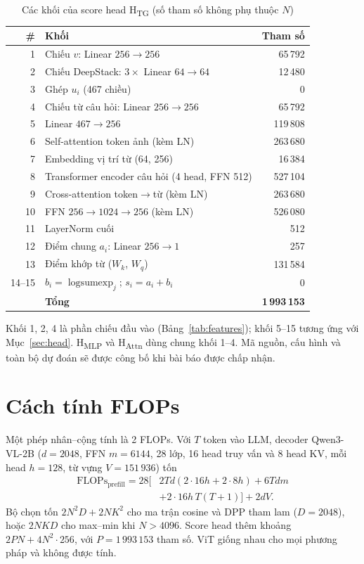 \documentclass[conference]{IEEEtran}
\newcommand{\Hmlp}{H\textsubscript{MLP}}
\newcommand{\Hattn}{H\textsubscript{Attn}}
\newcommand{\Htg}{H\textsubscript{TG}}
\begin{document}
\begin{table}[!htbp]
\centering
\caption{Các khối của score head \Htg{} (số tham số không phụ thuộc $N$)}
\label{tab:head}
\setlength{\tabcolsep}{3pt}
\footnotesize
\begin{tabular}{@{}rlr@{}}
\toprule
\# & Khối & Tham số\\
\midrule
1 & Chiếu $v$: Linear $256\rightarrow256$ & 65\,792\\
2 & Chiếu DeepStack: $3\times$ Linear $64\rightarrow64$ & 12\,480\\
3 & Ghép $u_i$ (467 chiều) & 0\\
4 & Chiếu từ câu hỏi: Linear $256\rightarrow256$ & 65\,792\\
5 & Linear $467\rightarrow256$ & 119\,808\\
6 & Self-attention token ảnh (kèm LN) & 263\,680\\
7 & Embedding vị trí từ (64, 256) & 16\,384\\
8 & Transformer encoder câu hỏi (4 head, FFN 512) & 527\,104\\
9 & Cross-attention token$\rightarrow$từ (kèm LN) & 263\,680\\
10 & FFN $256\rightarrow1024\rightarrow256$ (kèm LN) & 526\,080\\
11 & LayerNorm cuối & 512\\
12 & Điểm chung $a_i$: Linear $256\rightarrow1$ & 257\\
13 & Điểm khớp từ ($W_k$, $W_q$) & 131\,584\\
14--15 & $b_i=\operatorname{logsumexp}_j$; $s_i=a_i+b_i$ & 0\\
\midrule
& \textbf{Tổng} & \textbf{1\,993\,153}\\
\bottomrule
\end{tabular}
\end{table}

Khối 1, 2, 4 là phần chiếu đầu vào (Bảng~\ref{tab:features}); khối 5--15 tương ứng với Mục~\ref{sec:head}. \Hmlp{} và \Hattn{} dùng chung khối 1--4. Mã nguồn, cấu hình và toàn bộ dự đoán sẽ được công bố khi bài báo được chấp nhận.

\section{Cách tính FLOPs}
\label{app:flops}
Một phép nhân--cộng tính là 2 FLOPs. Với $T$ token vào LLM, decoder Qwen3-VL-2B ($d=2048$, FFN $m=6144$, 28 lớp, 16 head truy vấn và 8 head KV, mỗi head $h=128$, từ vựng $V=151\,936$) tốn
\[
\begin{aligned}
\mathrm{FLOPs}_\text{prefill}=28\big[&2Td(2\cdot16h+2\cdot8h)+6Tdm\\
&+2\cdot16h\,T(T+1)\big]+2dV .
\end{aligned}
\]
Bộ chọn tốn $2N^2D+2NK^2$ cho ma trận cosine và DPP tham lam ($D=2048$), hoặc $2NKD$ cho max--min khi $N>4096$. Score head thêm khoảng $2PN+4N^2\cdot256$, với $P=1\,993\,153$ tham số. ViT giống nhau cho mọi phương pháp và không được tính.
\end{document}
